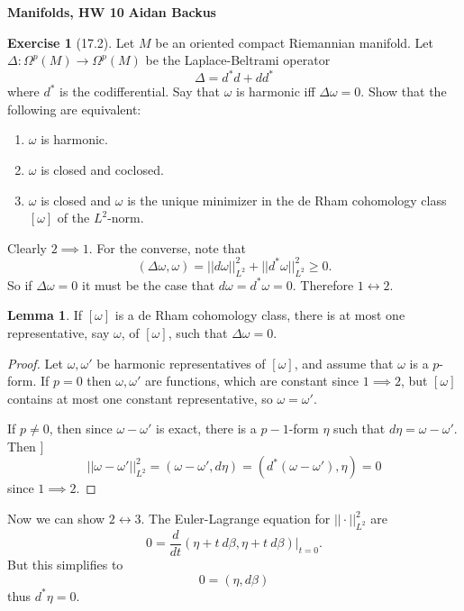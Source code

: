\documentclass[10pt]{article}
\renewcommand{\iff}{\leftrightarrow}
\theoremstyle{definition}
\newtheorem{exer}{Exercise}
\newtheorem{lemma}{Lemma}[exer]
\begin{document}
\noindent
\large\textbf{Manifolds, HW 10} \hfill \textbf{Aidan Backus} \\


\begin{exer}[17.2]
Let $M$ be an oriented compact Riemannian manifold. Let $\Delta: \Omega^p(M) \to \Omega^p(M)$ be the Laplace-Beltrami operator
$$\Delta = d^*d + dd^*$$
where $d^*$ is the codifferential. Say that $\omega$ is harmonic iff $\Delta \omega = 0$. Show that the following are equivalent:
\begin{enumerate}
\item $\omega$ is harmonic.
\item $\omega$ is closed and coclosed.
\item $\omega$ is closed and $\omega$ is the unique minimizer in the de Rham cohomology class $[\omega]$ of the $L^2$-norm.
\end{enumerate}
\end{exer}

Clearly $2 \implies 1$. For the converse, note that
$$(\Delta \omega, \omega) = ||d\omega||_{L^2}^2 + ||d^*\omega||_{L^2}^2 \geq 0.$$
So if $\Delta \omega = 0$ it must be the case that $d\omega = d^*\omega = 0$.
Therefore $1 \iff 2$.

\begin{lemma}
If $[\omega]$ is a de Rham cohomology class, there is at most one representative, say $\omega$, of $[\omega]$, such that $\Delta \omega = 0$.
\end{lemma}
\begin{proof}
Let $\omega, \omega'$ be harmonic representatives of $[\omega]$, and assume that $\omega$ is a $p$-form.
If $p = 0$ then $\omega,\omega'$ are functions, which are constant since $1 \implies 2$, but $[\omega]$ contains at most one constant representative, so $\omega = \omega'$.

If $p \neq 0$, then since $\omega - \omega'$ is exact, there is a $p-1$-form $\eta$ such that $d\eta = \omega - \omega'$. Then ]
$$||\omega - \omega'||_{L^2}^2 = (\omega - \omega', d\eta) = (d^*(\omega - \omega'), \eta) = 0$$
since $1 \implies 2$.
\end{proof}

Now we can show $2 \iff 3$. The Euler-Lagrange equation for $||\cdot||_{L^2}^2$ are
$$0 = \frac{d}{dt}(\eta + t~d\beta, \eta + t~d\beta)|_{t=0}.$$
But this simplifies to
$$0 = (\eta, d\beta)$$
thus $d^*\eta = 0$.
\end{document}
